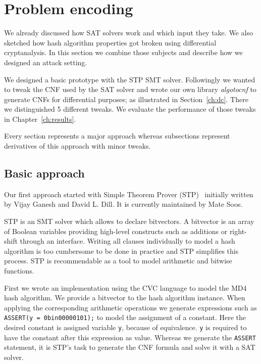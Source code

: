 \renewcommand*\chappic{img/encoding.pdf}
\renewcommand*\chapquote{There is concensus that encoding techniques usually have a dramatic impact on the efficiency of the SAT solver}
\renewcommand*\chapquotesrc{Magnus Bj\"ork}
\chapter{Problem encoding}
\label{ch:enc}

We already discussed how SAT solvers work and which input they take.
We also sketched how hash algorithm properties got broken using
differential cryptanalysis. In this section we combine those
subjects and describe how we designed an attack setting.

We designed a basic prototype with the STP SMT solver. Followingly
we wanted to tweak the CNF used by the SAT solver and wrote
our own library \emph{algotocnf} to generate CNFs for differential
purposes; as illustrated in Section~\ref{ch:dc}.
There we distinguished 5 different tweaks. We evaluate
the performance of those tweaks in Chapter~\ref{ch:results}.

Every section represents a major approach whereas subsections
represent derivatives of this approach with minor tweaks.

\section{Basic approach}
\label{sec:enc-stp}
%
Our first approach started with Simple Theorem Prover (STP)~\cite{stp}
initially written by Vijay Ganesh and David L. Dill.
It is currently maintained by Mate Soos.

STP is an SMT solver which allows to declare bitvectors. A bitvector is an array of
Boolean variables providing high-level constructs such as additions or right-shift
through an interface. Writing all clauses individually to model a hash algorithm
is too cumbersome to be done in practice and STP simplifies this process.
STP is recommendable as a tool to model arithmetic and bitwise functions.

First we wrote an implementation using the CVC language to model the MD4 hash algorithm.
We provide a bitvector to the hash algorithm instance. When applying the corresponding
arithmetic operations we generate expressions such as \texttt{ASSERT(y = 0bin00000101);}
to model the assignment of a constant. Here the desired constant is assigned variable
\texttt{y}, because of equivalence. \texttt{y} is required to have the constant
after this expression as value. Whereas we generate the \texttt{ASSERT} statement,
it is STP's task to generate the CNF formula and solve it with a SAT solver.

